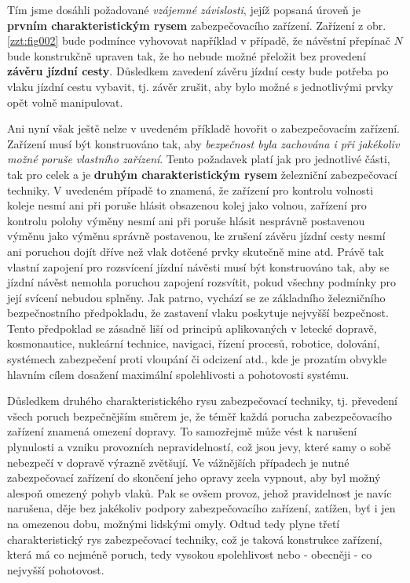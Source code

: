 {  Tím jsme dosáhli požadované \emph{vzájemné závislosti}, jejíž popsaná úroveň je \textbf{prvním
  charakteristickým rysem} zabezpečovacího zařízení. Zařízení z obr. \ref{zzt:fig002} bude podmínce 
  vyhovovat například v případě, že návěstní přepínač \(N\) bude konstrukčně upraven tak, že ho 
  nebude možné přeložit bez provedení \textbf{závěru jízdní cesty}. Důsledkem zavedení závěru 
  jízdní cesty bude potřeba po vlaku jízdní cestu vybavit, tj. závěr zrušit, aby bylo možné s 
  jednotlivými prvky opět volně manipulovat. 

  Ani nyní však ještě nelze v uvedeném příkladě hovořit o zabezpečovacím zařízení. Zařízení musí
  být konstruováno tak, aby \emph{bezpečnost byla zachována i při jakékoliv možné poruše vlastního 
  zařízení}. Tento  požadavek platí jak pro jednotlivé části, tak pro celek a je \textbf{druhým 
  charakteristickým rysem} železniční zabezpečovací techniky. V uvedeném případě to znamená, že 
  zařízení pro kontrolu volnosti koleje nesmí ani při poruše hlásit obsazenou kolej jako volnou, 
  zařízení pro kontrolu polohy výměny nesmí ani při poruše hlásit nesprávně postavenou výměnu jako 
  výměnu správně postavenou, ke zrušení závěru jízdní cesty nesmí ani poruchou dojít dříve než vlak 
  dotčené prvky skutečně mine atd. Právě tak vlastní zapojení pro rozsvícení jízdní návěsti musí 
  být konstruováno tak, aby se jízdní návěst nemohla poruchou zapojení rozsvítit, pokud všechny 
  podmínky pro její svícení nebudou splněny. Jak patrno, vychází se ze základního železničního
  bezpečnostního předpokladu, že zastavení vlaku poskytuje nejvyšší bezpečnost. Tento předpoklad se 
  zásadně liší od principů aplikovaných v letecké dopravě, kosmonautice, nukleární technice, 
  navigaci, řízení procesů, robotice, dolování, systémech zabezpečení proti vloupání či odcizení 
  atd., kde je prozatím obvykle hlavním cílem dosažení maximální spolehlivosti a pohotovosti 
  systému.
  
  Důsledkem druhého charakteristického rysu zabezpečovací techniky, tj. převedení všech poruch
  bezpečnějším směrem je, že téměř každá porucha zabezpečovacího zařízení znamená omezení dopravy. 
  To samozřejmě může vést k narušení plynulosti a vzniku provozních nepravidelností, což jsou jevy, 
  které samy o sobě nebezpečí v dopravě výrazně zvětšují. Ve vážnějších případech je nutné 
  zabezpečovací zařízení do skončení jeho opravy zcela vypnout, aby byl možný alespoň omezený pohyb 
  vlaků. Pak se ovšem provoz, jehož pravidelnost je navíc narušena, děje bez jakékoliv podpory 
  zabezpečovacího zařízení, zatížen, byť i jen na omezenou dobu, možnými lidskými omyly. Odtud tedy 
  plyne třetí charakteristický rys zabezpečovací techniky, což je taková konstrukce zařízení, která 
  má co nejméně poruch, tedy vysokou spolehlivost nebo - obecněji - co nejvyšší pohotovost. 
 
}
